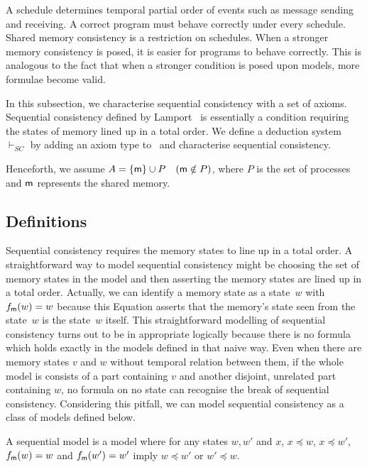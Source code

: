 A schedule determines temporal partial order of events such as
 message sending and receiving.
 A correct program must behave correctly under every schedule.
 Shared memory consistency is a restriction on schedules.
 When a stronger memory consistency is posed, it is easier for programs to behave
 correctly.  This is analogous to the fact
 that when a stronger condition
 is posed upon models, more formulae become valid.

 In this subsection, we characterise sequential consistency with a set of axioms.
 Sequential consistency defined by Lamport~\cite{lamport1979make} is essentially a condition requiring the states of memory lined up
 in a total order.
 We define a deduction system $\vdash_{SC}$ by adding an axiom type to \iec\, and
 characterise sequential consistency.

 Henceforth, we assume $A = \{{\sf m}\}\cup P\quad ({\sf m}\notin P)$, where $P$ is the
 set of processes and ${\sf m}$ represents the shared memory.

  \subsection{Definitions}

  Sequential consistency requires
  the memory states to line up in a total order.
  A straightforward way to model sequential consistency might be
  choosing the set of memory states in the model
  and then asserting the memory states are lined up in a total order.
  Actually, we can identify a memory state as a state~$w$ with
  $f_{\sf m}(w) = w$ because this Equation asserts that
  the memory's state seen from the state~$w$ is the state~$w$ itself.
  This straightforward modelling of sequential consistency turns out to be
  in appropriate logically because there is no formula which holds exactly
  in the models defined in that naive way.
  Even when there are memory states $v$ and $w$ without
  temporal relation between them,
  if the whole model is consists of a part containing $v$ and another disjoint,
  unrelated part
  containing $w$,
  no formula on no state can recognise the break of sequential consistency.
  Considering this pitfall, we can model sequential consistency as a class of models defined below.
  \begin{definition}
   A sequential model is a model where for any states $w, w'$ and $x$,
   $x\preceq w$, $x\preceq w'$, $f_{\sf m}(w) = w$ and $f_{\sf m}(w') = w'$ imply
   $w\preceq w'$ or $w'\preceq w$.
  \end{definition}

